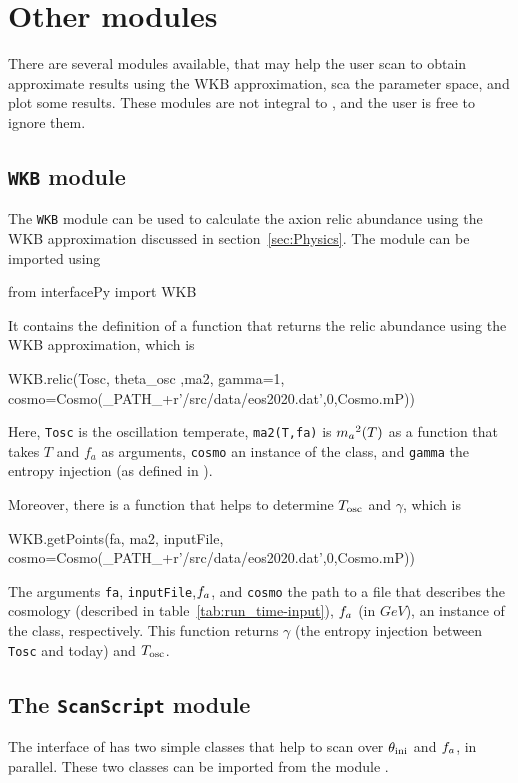 \documentclass[11pt,a4paper]{article}
\begin{document}
\section{Other modules}\label{app:other_modules}
%
There are several modules available, that may help the user scan to obtain approximate results using the WKB approximation, sca the parameter space, and plot some results. These modules are not
integral to \mimes, and the user is free to ignore them.

\subsection{{\tt WKB} module}
%
The {\tt WKB} module can be used to calculate the axion relic abundance using the WKB approximation discussed in section~\ref{sec:Physics}. The module can be imported using 
%
\begin{py}
	from interfacePy import WKB
\end{py}
%
It contains the definition of a function that returns the relic abundance using the WKB approximation, which is 
%
\begin{py}
	WKB.relic(Tosc, theta_osc ,ma2, gamma=1, 
	          cosmo=Cosmo(_PATH_+r'/src/data/eos2020.dat',0,Cosmo.mP))
\end{py}
%
Here, {\tt Tosc} is the oscillation temperate, {\tt ma2(T,fa)} is $m_{a}{}^2(T)$ as a function that takes $T$ and $f_a$ as arguments, {\tt cosmo} an instance of the  class, and {\tt gamma} the entropy injection (as defined in ). 

Moreover, there is a function that helps to determine $T_{\rm osc}{}$ and $\gamma$, which is
%
\begin{py}
	WKB.getPoints(fa, ma2, inputFile, cosmo=Cosmo(_PATH_+r'/src/data/eos2020.dat',0,Cosmo.mP))
\end{py}
%
The arguments {\tt fa}, {\tt inputFile},$f_{a}{}$, and {\tt cosmo} the path to a file that describes the cosmology (described in table~\ref{tab:run_time-input}), $f_{a}{}$ (in $GeV$), an instance of the  class, respectively.  
%
This function returns $\gamma$ (the entropy injection between {\tt Tosc} and today) and $T_{\rm osc}{}$.
 

\subsection{The {\tt ScanScript} module}\label{app:ScanScript}
%
The \PY interface of \mimes has two simple classes that help to scan over $\theta_{\rm ini}{}$ and $f_{a}{}$, in parallel. These two classes can be imported from the module .  
\end{document}
